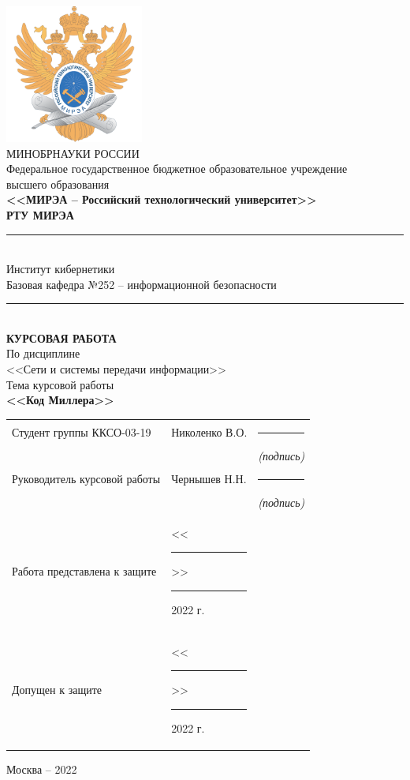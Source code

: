 \documentclass[utf8,14pt,a4paper,oneside,russian]{book}
\begin{document}
	
	\thispagestyle{empty}
	\small
	\begin{center}
		\includegraphics[width=4.55cm]{logo_mirea}\\
		\MakeUppercase{Минобрнауки России}\\[1em]
		Федеральное государственное бюджетное образовательное учреждение\\
		высшего образования\\[0.5em]
		\textbf{<<МИРЭА -- Российский технологический университет>>}\\
		\textbf{РТУ МИРЭА}\\
		\rule{\textwidth}{0.75pt}\\
		Институт кибернетики\\
		Базовая кафедра №252 -- информационной безопасности\\[-0.45em]
		\rule{\textwidth}{0.75pt}\\[5em]
		\normalsize\MakeUppercase{\textbf{Курсовая работа}}\small\\[0.5em]
		По дисциплине\\ <<Сети и системы передачи информации>>\\[1.5em]
		Тема курсовой работы\\ \textbf{<<Код Миллера>>} \\[3em]
		\begin{tabular}{p{7cm}p{6cm}c}
			Студент группы ККСО-03-19 & Николенко В.О. & \rule{2cm}{0.75pt}\\[-0.5em]
			& & \footnotesize\textit{(подпись)}\small\\[1em]
			Руководитель курсовой работы & Чернышев Н.Н. & \rule{2cm}{0.75pt}\\[-0.5em]
			& & \footnotesize\textit{(подпись)}\small\\[5em]
			Работа представлена к защите & <<\rule{0.5cm}{0.75pt}>> \rule{2cm}{0.75pt} 2022 г. & \\[1em]
			Допущен к защите & <<\rule{0.5cm}{0.75pt}>> \rule{2cm}{0.75pt} 2022 г. & \\[1em]
		\end{tabular}
		\vfill
		Москва -- 2022
	\end{center}
	\normalsize
	\newpage
	
\end{document}
